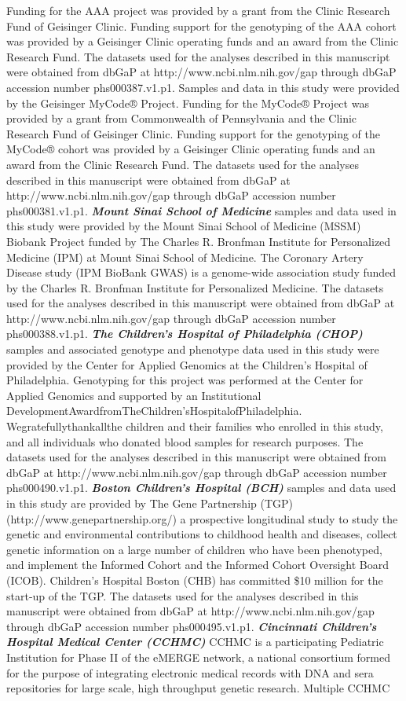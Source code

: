 \documentclass[12pt]{article}
\begin{document}
Funding for the AAA project was provided by a grant from the Clinic Research Fund of Geisinger Clinic. Funding support for the genotyping of the AAA cohort was provided by a Geisinger Clinic operating funds and an award from the Clinic Research Fund. The datasets used for the analyses described in this manuscript were obtained from dbGaP at http://www.ncbi.nlm.nih.gov/gap through dbGaP accession number phs000387.v1.p1. Samples and data in this study were provided by the Geisinger MyCode® Project. Funding for the MyCode® Project was provided by a grant from Commonwealth of Pennsylvania and the Clinic Research Fund of Geisinger Clinic. Funding support for the genotyping of the MyCode® cohort was provided by a Geisinger Clinic operating funds and an award from the Clinic Research Fund. The datasets used for the analyses described in this manuscript were obtained from dbGaP at http://www.ncbi.nlm.nih.gov/gap through dbGaP accession number phs000381.v1.p1. \textbf{\textit{Mount Sinai School of Medicine}} samples and data used in this study were provided by the Mount Sinai School of Medicine (MSSM) Biobank Project funded by The Charles R. Bronfman Institute for Personalized Medicine (IPM) at Mount Sinai School of Medicine. The Coronary Artery Disease study (IPM BioBank GWAS) is a genome-wide association study funded by the Charles R. Bronfman Institute for Personalized Medicine. The datasets used for the analyses described in this manuscript were obtained from dbGaP at http://www.ncbi.nlm.nih.gov/gap through dbGaP accession number phs000388.v1.p1. \textbf{\textit{The Children’s Hospital of Philadelphia (CHOP)}} samples and associated genotype and phenotype data used in this study were provided by the Center for Applied Genomics at the Children’s Hospital of Philadelphia. Genotyping for this project was performed at the Center for Applied Genomics and supported by an Institutional DevelopmentAwardfromTheChildren’sHospitalofPhiladelphia. Wegratefullythankallthe children and their families who enrolled in this study, and all individuals who donated blood samples for research purposes. The datasets used for the analyses described in this manuscript were obtained from dbGaP at http://www.ncbi.nlm.nih.gov/gap through dbGaP accession number phs000490.v1.p1. \textbf{\textit{Boston Children's Hospital (BCH)}} samples and data used in this study are provided by The Gene Partnership (TGP) (http://www.genepartnership.org/) a prospective longitudinal study to study the genetic and environmental contributions to childhood health and diseases, collect genetic information on a large number of children who have been phenotyped, and implement the Informed Cohort and the Informed Cohort Oversight Board (ICOB). Children's Hospital Boston (CHB) has committed \$10 million for the start-up of the TGP. The datasets used for the analyses described in this manuscript were obtained from dbGaP at http://www.ncbi.nlm.nih.gov/gap through dbGaP accession number phs000495.v1.p1. \textbf{\textit{Cincinnati Children’s Hospital Medical Center (CCHMC)}} CCHMC is a participating Pediatric Institution for Phase II of the eMERGE network, a national consortium formed for the purpose of integrating electronic medical records with DNA and sera repositories for large scale, high throughput genetic research. Multiple CCHMC 
\end{document}

